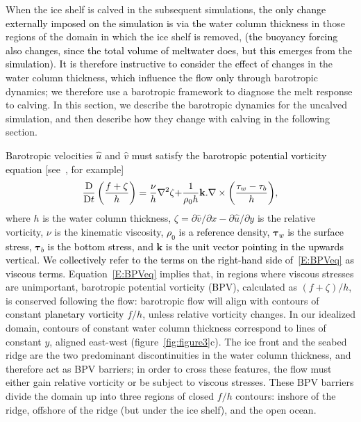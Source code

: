 \documentclass[draft]{agujournal2019}
\newcommand{\rout}[1]{\red{\st{#1}}}\newcommand{\ab}[1]{\textcolor{Green}{#1}}\newcommand{\about}[1]{\textcolor{Cyan}{\sout{#1}}}
\newcommand{\blue}[1]{\textcolor{blue}{#1}}
\newcommand{\red}[1]{\textcolor{red}{#1}}
\renewcommand{\rout}[1]{{}} %
\renewcommand{\blue}[1]{{\textcolor{black}{#1}}} %
\renewcommand{\red}[1]{{}} %
\begin{document}
When the ice shelf is calved in the subsequent simulations, \blue{ the only change externally imposed on the simulation is via the water column thickness }\rout{we alter the imposed water column thickness} in those regions of the domain in which the ice shelf is removed, \rout{and the buoyancy flux that emerges from the simulation is changes because the total volume of meltwater changes} \blue{(the buoyancy forcing also changes, since the total volume of meltwater does, but this emerges from the simulation)}. \blue{It is therefore instructive to consider the effect of} \rout{C}\blue{c}hanges in the water column thickness\blue{, which} influence the flow \blue{only }through barotropic dynamics; we therefore use a barotropic framework to diagnose the melt response to calving. In this section, we describe the barotropic dynamics for the uncalved simulation, and then describe how they change with calving in the following section.

\rout{In the absence of surface and bottom stresses, b}\blue{B}arotropic velocities \rout{$u$}\blue{$\hat{u}$} and \rout{$v$}\blue{$\hat{v}$} must satisfy \blue{the barotropic potential vorticity equation} [see~, for example]
 \begin{equation}\label{E:BPVeq}
\frac{\mathrm{D}}{\mathrm{D}t}\left( \frac{f + \zeta}{h}\right) = \frac{\nu}{h}\nabla^2 \zeta \blue{+ \frac{1}{\rho_0 h}\mathbf{k} . \nabla \times \left( \frac{\mathbf{\tau}_w - \mathbf{\tau}_b}{h}\right)},
 \end{equation}
where $h$ is the water column thickness, $\zeta = \partial \hat{v} / \partial x - \partial \hat{u} / \partial y$ is the relative vorticity,  $\nu$ is the kinematic viscosity\blue{, $\rho_0$ is a reference density, $\mathbf{\tau}_w$ is the surface stress, $\mathbf{\tau}_b$ is the bottom stress, and $\mathbf{k}$ is the unit vector pointing in the upwards vertical}. \blue{We collectively refer to the terms on the right-hand side of~\eqref{E:BPVeq} as viscous terms.} 
Equation~\eqref{E:BPVeq} implies that, in regions where viscous stresses are unimportant, barotropic potential vorticity (\blue{B}PV),  calculated as $(f + \zeta)/h$, is conserved following the flow: barotropic flow will align with contours of constant \blue{planetary vorticity} $f/h$, unless relative vorticity changes. In our idealized domain, contours of constant water column thickness correspond to lines of constant $y$, aligned east-west (figure~\ref{fig:figure3}c). The ice front and the seabed ridge are the two predominant discontinuities in the water column thickness, and therefore act as BPV barriers; in order to cross these features, the flow must either gain relative vorticity or be subject to viscous stresses. These BPV barriers divide the domain up into three regions of closed $f/h$ contours: inshore of the ridge, offshore of the ridge (but under the ice shelf), and the open ocean.
\end{document}
